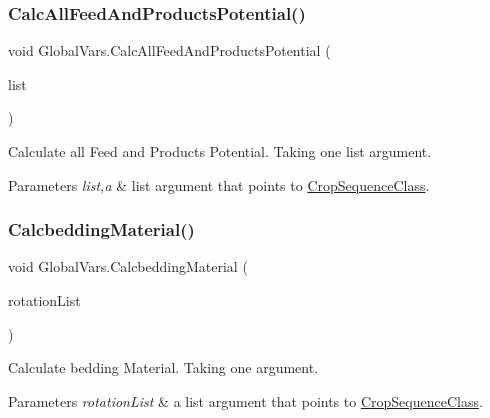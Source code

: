 \subsubsection{\texorpdfstring{CalcAllFeedAndProductsPotential()}{CalcAllFeedAndProductsPotential()}}
{\footnotesize\ttfamily void Global\+Vars.\+Calc\+All\+Feed\+And\+Products\+Potential (\begin{DoxyParamCaption}\item[{List$<$ \mbox{\hyperlink{class_crop_sequence_class}{Crop\+Sequence\+Class}} $>$}]{list }\end{DoxyParamCaption})\hspace{0.3cm}{\ttfamily [inline]}}



Calculate all Feed and Products Potential. Taking one list argument. 


\begin{DoxyParams}{Parameters}
{\em list,a} & list argument that points to \mbox{\hyperlink{class_crop_sequence_class}{Crop\+Sequence\+Class}}. \\
\hline
\end{DoxyParams}
\mbox{\label{class_global_vars_a0646815f7f1f52f4b870f0cde29b0109}} 
\subsubsection{\texorpdfstring{CalcbeddingMaterial()}{CalcbeddingMaterial()}}
{\footnotesize\ttfamily void Global\+Vars.\+Calcbedding\+Material (\begin{DoxyParamCaption}\item[{List$<$ \mbox{\hyperlink{class_crop_sequence_class}{Crop\+Sequence\+Class}} $>$}]{rotation\+List }\end{DoxyParamCaption})\hspace{0.3cm}{\ttfamily [inline]}}



Calculate bedding Material. Taking one argument. 


\begin{DoxyParams}{Parameters}
{\em rotation\+List} & a list argument that points to \mbox{\hyperlink{class_crop_sequence_class}{Crop\+Sequence\+Class}}. \\
\hline
\end{DoxyParams}
\mbox{\label{class_global_vars_a4ff00f80fd4199c713d481bae6213d96}} 

